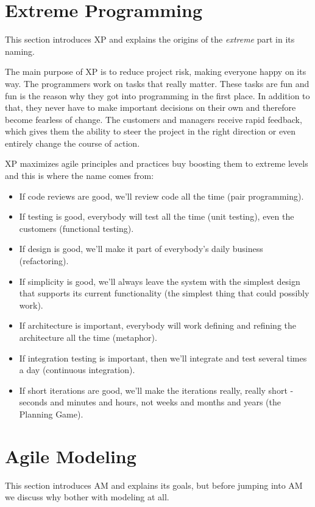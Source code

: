 \section{Extreme Programming}
This section introduces XP and explains the origins of the \emph{extreme}
part in its naming.

The main purpose of XP is to reduce project risk, making everyone happy on its
way. The programmers work on tasks that really matter. These tasks are fun and
fun is the reason why they got into programming in the first place. In
addition to that, they never have to make important decisions on their own and
therefore become fearless of change. The customers and managers receive rapid
feedback, which gives them the ability to steer the project in the right
direction or even entirely change the course of action.\cite{BeckAndres200411}

XP maximizes agile principles and practices buy boosting them to extreme levels
and this is where the name comes from:
\begin{itemize}
\item If code reviews are good, we'll review code all the time (pair
programming).
\item If testing is good, everybody will test all the time (unit testing), even
the customers (functional testing).
\item If design is good, we'll make it part of everybody's daily business
(refactoring).
\item If simplicity is good, we'll always leave the system with the simplest
design that supports its current functionality (the simplest thing that could
possibly work).
\item If architecture is important, everybody will work defining and refining
the architecture all the time (metaphor).
\item If integration testing is important, then we'll integrate and test
several times a day (continuous integration).
\item If short iterations are good, we'll make the iterations really, really
short - seconds and minutes and hours, not weeks and months and years (the
Planning Game).\cite{BeckAndres200411}
\end{itemize}

\section{Agile Modeling}
This section introduces AM and explains its goals, but before jumping into AM we
discuss why bother with modeling at all.


